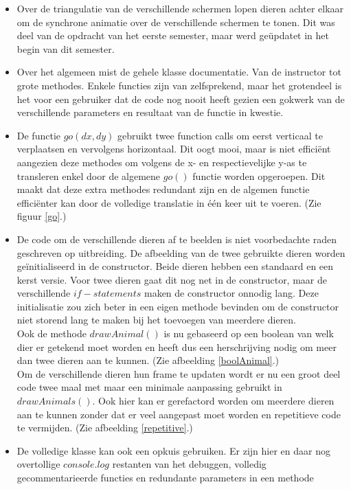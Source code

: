 \documentclass[a4paper,11pt]{article}
\begin{document}
\begin{itemize}
	\item Over de triangulatie van de verschillende schermen lopen dieren achter elkaar om de synchrone animatie over de verschillende schermen te tonen. Dit was deel van de opdracht van het eerste semester, maar werd geüpdatet in het begin van dit semester.
	
	\item Over het algemeen mist de gehele klasse documentatie. Van de instructor tot grote methodes. Enkele functies zijn van zelfsprekend, maar het grotendeel is het voor een gebruiker dat de code nog nooit heeft gezien een gokwerk van de verschillende parameters en resultaat van de functie in kwestie.
	
	\item De functie $go(dx, dy)$ gebruikt twee function calls om eerst verticaal te verplaatsen en vervolgens horizontaal. Dit oogt mooi, maar is niet efficiënt aangezien deze methodes om volgens de x- en respectievelijke y-as te transleren enkel door de algemene $go()$ functie worden opgeroepen. Dit maakt dat deze extra methodes redundant zijn en de algemen functie efficiënter kan door de volledige translatie in één keer uit te voeren. (Zie figuur \ref{go}.)
	
	\item De code om de verschillende dieren af te beelden is niet voorbedachte raden geschreven op uitbreiding. De afbeelding van de twee gebruikte dieren worden geïnitialiseerd in de constructor. Beide dieren hebben een standaard en een kerst versie. Voor twee dieren gaat dit nog net in de constructor, maar de verschillende $if-statements$ maken de constructor onnodig lang. Deze initialisatie zou zich beter in een eigen methode bevinden om de constructor niet storend lang te maken bij het toevoegen van meerdere dieren.\\
	Ook de methode $drawAnimal()$ is nu gebaseerd op een boolean van welk dier er getekend moet worden en heeft dus een herschrijving nodig om meer dan twee dieren aan te kunnen. (Zie afbeelding \ref{boolAnimal}.)\\
	Om de verschillende dieren hun frame te updaten wordt er nu een groot deel code twee maal met maar een minimale aanpassing gebruikt in $drawAnimals()$. Ook hier kan er gerefactord worden om meerdere dieren aan te kunnen zonder dat er veel aangepast moet worden en repetitieve code te vermijden. (Zie afbeelding \ref{repetitive}.)
	
	\item De volledige klasse kan ook een opkuis gebruiken. Er zijn hier en daar nog overtollige $console.log$ restanten van het debuggen, volledig gecommentarieerde functies en redundante parameters in een methode
\end{itemize}
\end{document}
